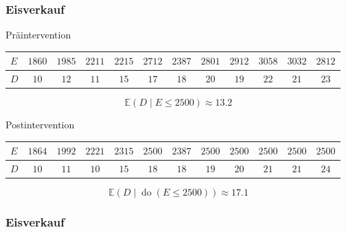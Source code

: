 \documentclass{beamer}
\newcommand{\Do}{\operatorname{do}}
\begin{document}
\begin{frame}
\frametitle{Eisverkauf}

Präintervention
\begin{tiny}
\begin{center}
\begin{tabular}{| l | c | c | c | c | c | c | c | c | c | c | c |}
\hline
$E$ & $1860$ & $1985$ & $2211$ & $2215$ & $2712$ & $2387$ & $2801$ & $2912$ & $3058$ & $3032$ & $2812$\\
\hline
$D$ & $10$ & $12$ & $11$ & $15$ & $17$ & $18$ & $20$ & $19$ & $22$ & $21$ & $23$\\
\hline
\end{tabular}
\end{center}
\end{tiny}

\[\mathbb{E}(D \mid E \leq 2500) \approx 13.2\]

\pause

Postintervention
\begin{tiny}
\begin{center}
\begin{tabular}{| l | c | c | c | c | c | c | c | c | c | c | c |}
\hline
$E$ & $1864$ & $1992$ & $2221$ & $2315$ & $2500$ & $2387$ & $2500$ & $2500$ & $2500$ & $2500$ & $2500$\\
\hline
$D$ & $10$ & $11$ & $10$ & $15$ & $18$ & $18$ & $19$ & $20$ & $21$ & $21$ & $24$\\
\hline
\end{tabular}
\end{center}
\end{tiny}

\[\mathbb{E}(D \mid \Do(E \leq 2500)) \approx 17.1\]
\end{frame}

\begin{frame}
\frametitle{Eisverkauf}

\begin{center}
\end{center}
\end{frame}
\end{document}
